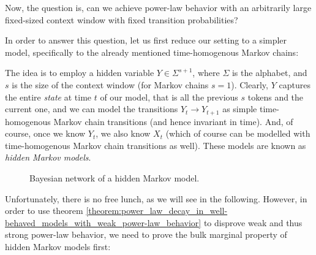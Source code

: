 \documentclass[../../main.tex]{subfiles}
\begin{document}
    Now, the question is, can we achieve power-law behavior with an arbitrarily large fixed-sized context window with fixed transition probabilities?

    In order to answer this question, let us first reduce our setting to a simpler model, specifically to the already mentioned time-homogenous Markov chains:
    
    The idea is to employ a hidden variable $Y \in \Sigma ^{s+1}$, where $\Sigma$ is the alphabet, and $s$ is the size of the context window (for Markov chains $s = 1$). Clearly, $Y$ captures the entire \emph{state} at time $t$ of our model, that is all the previous $s$ tokens and the current one, and we can model the transitions $Y_t \to Y_{t + 1}$ as simple time-homogenous Markov chain transitions (and hence invariant in time). And, of course, once we know $Y_t$, we also know $X_t$ (which of course can be modelled with time-homogenous Markov chain transitions as well). These models are known as \emph{hidden Markov models}.

    \begin{figure}[h]
        \center
        \caption{Bayesian network of a hidden Markov model.}
        \label{fig:bayesian_network_hidden_markov}
    \end{figure}

    \bigskip
    Unfortunately, there is no free lunch, as we will see in the following. However, in order to use theorem \ref{theorem:power_law_decay_in_well-behaved_models_with_weak_power-law_behavior} to disprove weak and thus strong power-law behavior, we need to prove the bulk marginal property of hidden Markov models first:
 
\end{document}
